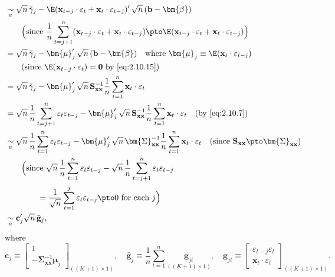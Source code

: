 \begin{align*}
&\underset{a}{\sim}
\sqrt{n}\,\tilde{\gamma}_j
- \E(\mathbf{x}_{t-j}\cdot\varepsilon_t + \mathbf{x}_t\cdot\varepsilon_{t-j})'\,
\sqrt{n}\,(\mathbf{b} - \bm{\beta}) \\
&\qquad \Bigl(\text{since }
\frac{1}{n}\sum_{t=j+1}^{n}
(\mathbf{x}_{t-j}\cdot\varepsilon_t + \mathbf{x}_t\cdot\varepsilon_{t-j})
\pto \E(\mathbf{x}_{t-j}\cdot\varepsilon_t + \mathbf{x}_t\cdot\varepsilon_{t-j})\Bigr) \\
&= \sqrt{n}\,\tilde{\gamma}_j - \bm{\mu}_j'\,\sqrt{n}\,(\mathbf{b} - \bm{\beta})
\quad \text{where } \bm{\mu}_j \equiv \E(\mathbf{x}_t\cdot\varepsilon_{t-j}) \\
&\qquad \text{(since } \E(\mathbf{x}_{t-j}\cdot\varepsilon_t) = \mathbf{0}
\text{ by \eqref{eq:2.10.15})} \\
&= \sqrt{n}\,\tilde{\gamma}_j
- \bm{\mu}_j'\,\sqrt{n}\,\mathbf{S}_{\mathbf{xx}}^{-1}
\frac{1}{n}\sum_{t=1}^{n}\mathbf{x}_t\cdot\varepsilon_t \\
&= \sqrt{n}\,\frac{1}{n}\sum_{t=j+1}^{n}\varepsilon_t\varepsilon_{t-j}
- \bm{\mu}_j'\,\sqrt{n}\,\mathbf{S}_{\mathbf{xx}}^{-1}
\frac{1}{n}\sum_{t=1}^{n}\mathbf{x}_t\cdot\varepsilon_t
\quad \text{(by \eqref{eq:2.10.7})} \\
&\underset{a}{\sim}
\sqrt{n}\,\frac{1}{n}\sum_{t=1}^{n}\varepsilon_t\varepsilon_{t-j}
- \bm{\mu}_j'\,\sqrt{n}\,\bm{\Sigma}_{\mathbf{xx}}^{-1}
\frac{1}{n}\sum_{t=1}^{n}\mathbf{x}_t\cdot\varepsilon_t
\quad (\text{since } \mathbf{S}_{\mathbf{xx}} \pto \bm{\Sigma}_{\mathbf{xx}}) \\
&\qquad \Bigl(\text{since }
\sqrt{n}\,\frac{1}{n}\sum_{t=1}^{n}\varepsilon_t\varepsilon_{t-j}
- \sqrt{n}\,\frac{1}{n}\sum_{t=j+1}^{n}\varepsilon_t\varepsilon_{t-j} \\
&\qquad\qquad = \frac{1}{\sqrt{n}}\sum_{t=1}^{j}\varepsilon_t\varepsilon_{t-j}
\pto 0 \text{ for each } j\Bigr) \\
&\underset{a}{\sim}
\mathbf{c}_j'\sqrt{n}\,\bar{\mathbf{g}}_j,
\end{align*}
%
where
%
\begin{equation}
\mathbf{c}_j \equiv \begin{bmatrix} 1 \\ -\bm{\Sigma}_{\mathbf{xx}}^{-1}\bm{\mu}_j
\end{bmatrix}_{((K+1)\times 1)}, \quad
\bar{\mathbf{g}}_j \equiv \frac{1}{n}\sum_{t=1}^{n}\underset{((K+1)\times 1)}{\mathbf{g}_{jt}}, \quad
\mathbf{g}_{jt} \equiv \begin{bmatrix}
\varepsilon_{t-j}\varepsilon_t \\ \mathbf{x}_t\cdot\varepsilon_t
\end{bmatrix}_{((K+1)\times 1)}.
\label{eq:2.B.1}
\end{equation}
